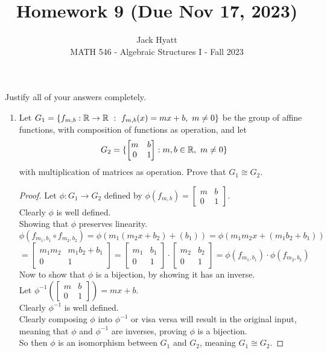 \documentclass[12pt]{article}
\begin{document}
	
	
	
	\title{Homework 9 (Due Nov 17, 2023)}
	\author{Jack Hyatt\\ %
		MATH 546 - Algebraic Structures I - Fall 2023} 
	
	\maketitle
	
	Justify all of your answers completely.\\
	
	
	\medskip 
	
	\begin{enumerate}
		\item Let $G_1 = \{f_{m,b}:\R\rightarrow\R\ :\ f_{m,b}(x) = mx+b,\ m\neq0\}$ be the group of affine functions, with composition of functions as operation, and let
		\[G_2 = \{\begin{bmatrix}
			m & b\\
			0 & 1
		\end{bmatrix} : m,b\in\mathbb{R},\ m\neq0\}\]
		with multiplication of matrices as operation. Prove that $G_1 \cong G_2$.
		\begin{proof}
			Let $\phi:G_1\rightarrow G_2$ defined by $\phi(f_{m,b}) = \begin{bmatrix} m & b\\0 & 1\end{bmatrix}$.\\
			Clearly $\phi$ is well defined.\\
			Showing that $\phi$ preserves linearity.\\
			\[\phi(f_{m_1,b_1} \circ f_{m_2,b_2}) = \phi(m_1(m_2x+b_2)+(b_1)) = \phi(m_1m_2x+(m_1b_2+b_1))\]
			\[ = \begin{bmatrix}
				m_1m_2 & m_1b_2 + b_1 \\ 0 & 1
			\end{bmatrix}=\begin{bmatrix}m_1&b_1\\0&1\end{bmatrix} \cdot \begin{bmatrix}m_2&b_2\\0&1\end{bmatrix} = \phi(f_{m_1,b_1}) \cdot \phi(f_{m_2,b_2})\]
			Now to show that $\phi$ is a bijection, by showing it has an inverse.\\
			Let $\phi^{-1}(\begin{bmatrix}m&b\\0&1\end{bmatrix}) = mx+b$.\\
			Clearly $\phi^{-1}$ is well defined.\\
			Clearly composing $\phi$ into $\phi^{-1}$ or visa versa will result in the original input, meaning that $\phi$ and $\phi^{-1}$ are inverses, proving $\phi$ is a bijection.\\
			So then $\phi$ is an isomorphism between $G_1$ and $G_2$, meaning $G_1\cong G_2$.
		\end{proof}
		

\end{enumerate}
\end{document}

